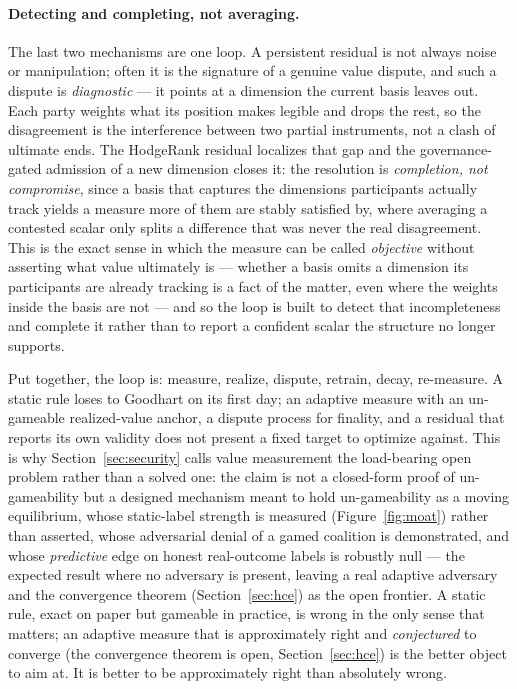 \documentclass[10pt]{article}
\begin{document}
\paragraph{Detecting and completing, not averaging.} The last two mechanisms are one loop. A
persistent residual is not always noise or manipulation; often it is the signature of a genuine value
dispute, and such a dispute is \emph{diagnostic} --- it points at a dimension the current basis leaves
out. Each party weights what its position makes legible and drops the rest, so the disagreement is the
interference between two partial instruments, not a clash of ultimate ends. The HodgeRank residual
localizes that gap and the governance-gated admission of a new dimension closes it: the resolution is
\emph{completion, not compromise}, since a basis that captures the dimensions participants actually
track yields a measure more of them are stably satisfied by, where averaging a contested scalar only
splits a difference that was never the real disagreement. This is the exact sense in which the measure
can be called \emph{objective} without asserting what value ultimately is --- whether a basis omits a
dimension its participants are already tracking is a fact of the matter, even where the weights inside
the basis are not --- and so the loop is built to detect that incompleteness and complete it rather
than to report a confident scalar the structure no longer supports.

\noindent
Put together, the loop is: measure, realize, dispute, retrain, decay, re-measure. A static rule loses to
Goodhart on its first day; an adaptive measure with an un-gameable realized-value anchor, a dispute
process for finality, and a residual that reports its own validity does not present a fixed target to
optimize against. This is why Section~\ref{sec:security} calls value measurement the load-bearing open
problem rather than a solved one: the claim is not a closed-form proof of un-gameability but a designed
mechanism meant to hold un-gameability as a moving equilibrium, whose static-label strength is measured
(Figure~\ref{fig:moat}) rather than asserted, whose adversarial denial of a gamed coalition is
demonstrated, and whose \emph{predictive} edge on honest real-outcome labels is robustly null --- the
expected result where no adversary is present, leaving a real adaptive adversary and the convergence
theorem (Section~\ref{sec:hce}) as the open frontier. A static rule, exact on paper but gameable in practice, is wrong in the only sense that
matters; an adaptive measure that is approximately right and \emph{conjectured} to converge (the
convergence theorem is open, Section~\ref{sec:hce}) is the better object to aim at. It is better to be
approximately right than absolutely wrong.
\end{document}
